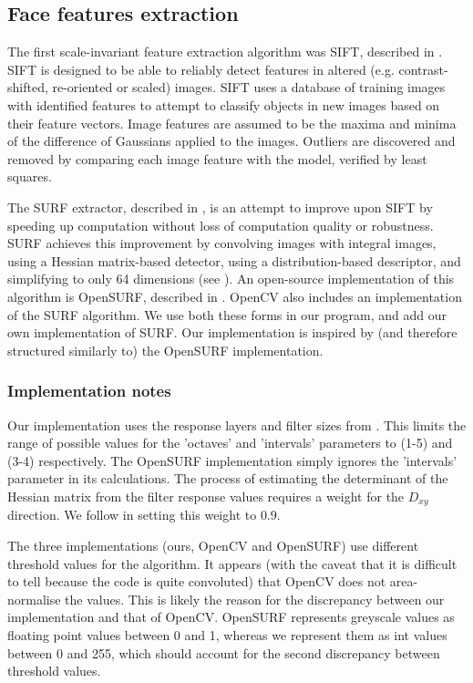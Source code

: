 
\subsection{Face features extraction}
\label{sec:features}

The first scale-invariant feature extraction algorithm was SIFT, described in \cite{SIFT}. SIFT is designed to be able to reliably detect features in altered (e.g. contrast-shifted, re-oriented or scaled) images. SIFT uses a database of training images with identified features to attempt to classify objects in new images based on their feature vectors. Image features are assumed to be the maxima and minima of the difference of Gaussians applied to the images. Outliers are discovered and removed by comparing each image feature with the model, verified by least squares.

The SURF extractor, described in \cite{SURF}, is an attempt to improve upon SIFT by speeding up computation without loss of computation quality or robustness. SURF achieves this improvement by convolving images with integral images, using a Hessian matrix-based detector, using a distribution-based descriptor, and simplifying to only 64 dimensions (see \cite{SURF}). An open-source implementation of this algorithm is OpenSURF, described in \cite{OpenSURF}. OpenCV also includes an implementation of the SURF algorithm. We use both these forms in our program, and add our own implementation of SURF. Our implementation is inspired by (and therefore structured similarly to) the OpenSURF implementation.

\subsubsection{Implementation notes}
Our implementation uses the response layers and filter sizes from \cite{SURF}. This limits the range of possible values for the 'octaves' and 'intervals' parameters to (1-5) and (3-4) respectively. The OpenSURF implementation simply ignores the 'intervals' parameter in its calculations. The process of estimating the determinant of the Hessian matrix from the filter response values requires a weight for the $D_{xy}$ direction. We follow \cite{SURF} in setting this weight to $0.9$.

The three implementations (ours, OpenCV and OpenSURF) use different threshold values for the algorithm. It appears (with the caveat that it is difficult to tell because the code is quite convoluted) that OpenCV does not area-normalise the values. This is likely the reason for the discrepancy between our implementation and that of OpenCV. OpenSURF represents greyscale values as floating point values between 0 and 1, whereas we represent them as int values between 0 and 255, which should account for the second discrepancy between threshold values.

